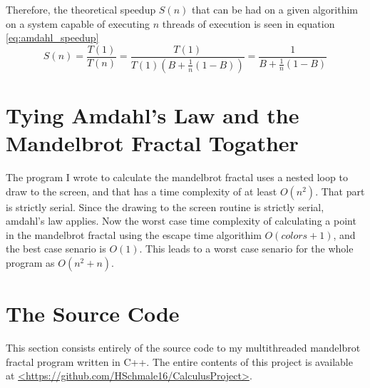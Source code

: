 \documentclass[10pt,oneside,letter]{article}
\begin{document}
Therefore, the theoretical speedup $S(n)$ that can be had on a given algorithim
on a system capable of executing $n$ threads of execution is seen in equation
\eqref{eq:amdahl_speedup}
\begin{equation} \label{eq:amdahl_speedup}
    S(n) = \frac{T(1)}{T(n)}
         = \frac{T(1)}{T(1)(B+\frac{1}{n}(1-B))}
         = \frac{1}{B+\frac{1}{n}(1-B)}
\end{equation}

\section{Tying Amdahl's Law and the Mandelbrot Fractal Togather}
The program I wrote to calculate the mandelbrot fractal uses a nested loop to
draw to the screen, and that has a time complexity of at least $O(n^2)$. That
part is strictly serial. Since the drawing to the screen routine is strictly
serial, amdahl's law applies. Now the worst case time complexity of calculating a
point in the mandelbrot fractal using the escape time algorithim $O({colors} + 1)$,
and the best case senario is $O(1)$. This leads to a worst case senario for the
whole program as $O(n^2 + n)$.

\section{The Source Code}
This section consists entirely of the source code to my multithreaded
mandelbrot fractal program written in C++. The entire contents of this project
is available at \url{<https://github.com/HSchmale16/CalculusProject>}.

\end{document}

